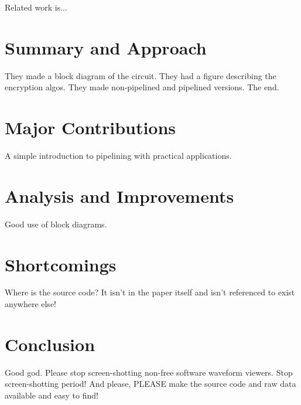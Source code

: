 \documentclass[journal,twocolumn]{IEEEtran}
\begin{document}
Related work is...

\section{Summary and Approach}

They made a block diagram of the circuit. They had a figure describing the 
encryption algos. They made non-pipelined and pipelined versions. The end.

\section{Major Contributions}

A simple introduction to pipelining with practical applications.


\section{Analysis and Improvements}

Good use of block diagrams.

\section{Shortcomings}

Where is the source code? It isn't in the paper itself and isn't referenced to
exist anywhere else!

\section{Conclusion}

Good god. Please stop screen-shotting non-free software waveform viewers. Stop 
screen-shotting period! And please, PLEASE make the source code and raw data 
available and easy to find!



\end{document}
